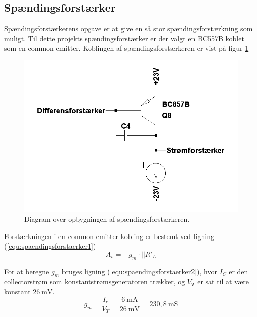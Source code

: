 \subsection{Spændingsforstærker}
\label{effekt_spaendingsforstaerker}
Spændingsforstærkerens opgave er at give en så stor spændingsforstærkning som muligt. Til dette projekts spændingsforstærker er der valgt en BC557B koblet som en common-emitter. Koblingen af spændingsforstærkeren er vist på figur \ref{spaendingsforstaerker_diagram}

\begin{figure}[h]
\centering
\includegraphics[scale=0.3]{teknisk/effektforstaerker/spaendingsforstaerker_diagram.png}
\caption{Diagram over opbygningen af spændingsforstærkeren.}
\label{spaendingsforstaerker_diagram}
\end{figure}

Forstærkningen i en common-emitter kobling er bestemt ved ligning (\ref{equ:spaendingsforstaerker1}) \cite{ael-mm7}%
\begin{equation}
\label{equ:spaendingsforstaerker1}
A_v = -g_m \cdot || R'_L
\end{equation}

For at beregne $g_m$ bruges ligning (\ref{equ:spaendingsforstaerker2}), hvor $I_C$ er den collectorstrøm som konstantstrømsgeneratoren trækker, og $V_T$ er sat til at være konstant $26~\mathrm{mV}$.
\begin{equation}
\label{equ:spaendingsforstaerker2}
g_m = \frac{I_c}{V_T} = \frac{6~\mathrm{mA}}{26~\mathrm{mV}} = 230,8~\mathrm{mS}
\end{equation}

